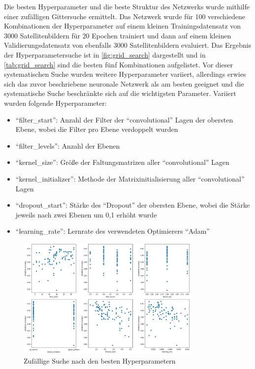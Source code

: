 Die besten Hyperparameter und die beste Struktur des Netzwerks wurde mithilfe einer zufälligen Gittersuche ermittelt.
Das Netzwerk wurde für 100 verschiedene Kombinationen der Hyperparameter auf einem kleinen Trainingsdatensatz von 3000 Satellitenbildern für 20 Epochen trainiert
und dann auf einem kleinen Validierungsdatensatz von ebenfalls 3000 Satellitenbildern evaluiert.
Das Ergebnis der Hyperparametersuche ist in \autoref{fig:grid_search} dargestellt und in \autoref{tab:grid_search} sind die besten fünf Kombinationen aufgelistet.
Vor dieser systematischen Suche wurden weitere Hyperparameter variiert, allerdings erwies sich das zuvor beschriebene neuronale Netzwerk als am besten geeignet
und die systematische Suche beschränkte sich auf die wichtigsten Parameter.
Variiert wurden folgende Hyperparameter:
 
\begin{itemize}
    \setlength\itemsep{-0.5em}
    \item \enquote{filter\_start}: Anzahl der Filter der \enquote{convolutional} Lagen der obersten Ebene, wobei die Filter pro Ebene verdoppelt wurden
    \item \enquote{filter\_levels}: Anzahl der Ebenen
    \item \enquote{kernel\_size}: Größe der Faltungsmatrizen aller \enquote{convolutional} Lagen
    \item \enquote{kernel\_initializer}: Methode der Matrixinitialisierung aller \enquote{convolutional} Lagen
    \item \enquote{dropout\_start}: Stärke des \enquote{Dropout} der obersten Ebene, wobei die Stärke jeweils nach zwei Ebenen um 0,1 erhöht wurde
    \item \enquote{learning\_rate}: Lernrate des verwendeten Optimierers \enquote{Adam}
\end{itemize}

\begin{figure}
    \centering
    \includegraphics[width=0.8\textwidth]{images/grid_search.png}
    \caption{Zufällige Suche nach den besten Hyperparametern}
    \label{fig:grid_search}
\end{figure}

